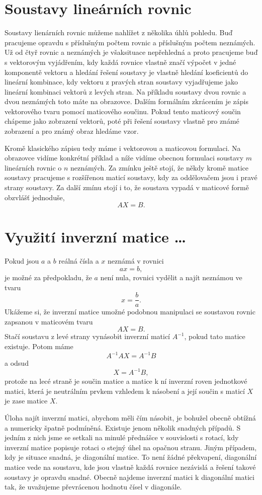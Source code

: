 \documentclass[12pt]{article}
\begin{document}
\section{Soustavy lineárních rovnic}

Soustavy lienárních rovnic můžeme nahlížet z několika úhlů pohledu. Buď pracujeme opravdu s příslušným počtem rovnic a příslušným počtem neznámých. Už od čtyř rovnic a neznámých je všaksituace nepřehledná a proto pracujeme buď s vektorovým vyjádřením, kdy každá rovnice vlastně značí výpočet v jedné komponentě vektoru a hledání řešení soustavy je vlastně hledání koeficientů do lineární kombinace, kdy vektoru z pravých stran soustavy vyjadřujeme jako lineární kombinaci vektorů z levých stran. Na příkladu soustavy dvou rovnic a dvou neznámých toto máte na obrazovce. Dalším formálním zkrácením je zápis vektorového tvaru pomocí maticového součinu. Pokud tento maticový součin chápeme jako zobrazení vektorů, poté při řešení soustavy vlastně pro známé zobrazení a pro známý obraz hledáme vzor. 

Kromě klasického zápisu tedy máme i vektorovou a maticovou formulaci. Na obrazovce vidíme konkrétní příklad a níže vidíme obecnou formulaci soustavy $m$ lineárních rovnic o $n$ neznámých. Za zmínku ještě stojí, že někdy kromě matice soustavy pracujeme s rozšířenou maticí soustavy, kdy za oddělovačem jsou i pravé strany soustavy. Za další zmínu stojí i to, že soustava vypadá v maticové formě obzvlášť jednoduše, $$AX=B.$$ 

\section{Využití inverzní matice \dots}

Pokud jsou $a$ a $b$ reálná čísla a $x$ neznámá v rovnici $$ax=b,$$ je možné za předpokladu, že $a$ není nula, rovnici vydělit a najít neznámou ve tvaru $$x=\frac ba.$$ Ukážeme si, že inverzní matice umožné podobnou manipulaci se soustavou rovnic zapsanou v maticovém tvaru $$AX=B.$$
Stačí soustavu z levé strany vynásobit inverzní maticí $A^{-1}$, pokud tato matice existuje. Potom máme $$A^{-1}AX=A^{-1}B$$ a odsud 
$$X=A^{-1}B, $$ protože na lecé straně je součin matice a matice k ní inverzní roven jednotkové matici, která je neutrálním prvkem vzhledem k násobení a její součin s maticí $X$ je zase matice $X$.

Úloha najít inverzní matici, abychom měli čím násobit, je bohužel obecně obtížná a numericky špatně podmíněná. Existuje jenom několik snadných případů. S jedním z nich jsme se setkali na minulé přednášce v souvislosti s rotací, kdy inverzní matice popisuje rotaci o stejný úhel na opačnou stranu. Jiným případem, kdy je situace snadná, je diagonální matice. To není žádné překvapení, diagonální matice vede na soustavu, kde jsou vlastně každá rovnice nezávislá a řešení takové soustavy je opravdu snadné. Obecně najdeme inverzní matici k diagonální matici tak, že uvažujeme převrácenou hodnotu čísel v diagonále. 
\end{document}
